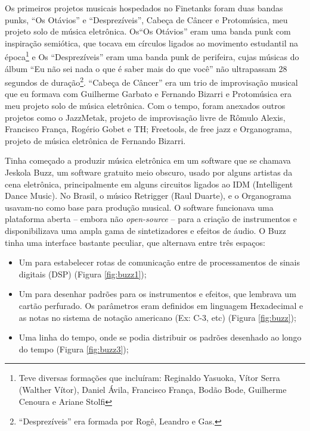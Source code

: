 Os primeiros projetos musicais hospedados no Finetanks foram duas bandas punks, ``Os Otávios'' e ``Desprezíveis'', Cabeça de Câncer e Protomúsica, meu projeto solo de música eletrônica. Os``Os Otávios'' eram uma banda punk com inspiração semiótica, que tocava em círculos ligados ao movimento estudantil na época\footnote{Teve diversas formações que incluíram: Reginaldo Yasuoka, Vítor Serra (Walther Vítor), Daniel Ávila, Francisco França, Bodão Bode, Guilherme Cenoura e Ariane Stolfi} e Os ``Desprezíveis'' eram uma banda punk de perifeira, cujas músicas do álbum ``Eu não sei nada o que é saber mais do que você'' não ultrapassam 28 segundos de duração\footnote{``Desprezíveis'' era formada por Rogê, Leandro e Gas.}. ``Cabeça de Câncer'' era um trio de improvisação musical que eu formava com Guilherme Garbato e Fernando Bizarri e Protomúsica era meu projeto solo de música eletrônica. Com o tempo, foram anexados outros projetos como o JazzMetak, projeto de improvisação livre de Rômulo Alexis, Francisco França, Rogério Gobet e TH; Freetools, de free jazz e Organograma, projeto de música eletrônica de Fernando Bizarri.

Tinha começado a produzir música eletrônica em um software que se chamava Jeskola Buzz, um software gratuito meio obscuro, usado por alguns artistas da cena eletrônica, principalmente em alguns circuitos ligados ao IDM (Intelligent Dance Music). No Brasil, o músico Retrigger (Raul Duarte), e o Organograma usavam-no como base para produção musical. O software funcionava uma plataforma aberta -- embora não \emph{open-source} -- para a criação de instrumentos e disponibilizava uma ampla gama de sintetizadores e efeitos de áudio. O Buzz tinha uma interface bastante peculiar, que alternava entre três espaços:

\begin{itemize}
\item Um para estabelecer rotas de comunicação entre de processamentos de sinais digitais (DSP) (Figura \ref{fig:buzz1});
\item Um para desenhar padrões para os instrumentos e efeitos, que lembrava um cartão perfurado. Os parâmetros eram definidos em linguagem Hexadecimal e as notas no sistema de notação americano (Ex: C-3, etc) (Figura \ref{fig:buzz});
\item Uma linha do tempo, onde se podia distribuir os padrões desenhado ao longo do tempo (Figura \ref{fig:buzz3});
\end{itemize}


